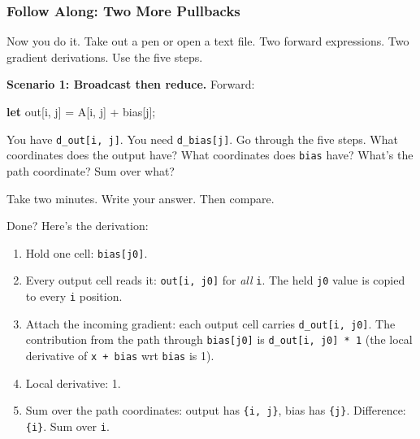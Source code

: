 \documentclass[11pt,titlepage]{article}
\newenvironment{Shaded}{}{}
\newcommand{\KeywordTok}[1]{\textcolor[rgb]{0.00,0.44,0.13}{\textbf{#1}}}
\newcommand{\NormalTok}[1]{#1}
\newcommand{\OperatorTok}[1]{\textcolor[rgb]{0.40,0.40,0.40}{#1}}
\providecommand{\tightlist}{%
  \setlength{\itemsep}{0pt}\setlength{\parskip}{0pt}}
\begin{document}
\vspace{2em}

\hypertarget{follow-along-two-more-pullbacks}{%
\subsubsection{Follow Along: Two More
Pullbacks}\label{follow-along-two-more-pullbacks}}

Now you do it. Take out a pen or open a text file. Two forward
expressions. Two gradient derivations. Use the five steps.

\textbf{Scenario 1: Broadcast then reduce.} Forward:

\begin{Shaded}
\begin{Highlighting}[]
\KeywordTok{let}\NormalTok{ out}\OperatorTok{[}\NormalTok{i, j}\OperatorTok{]}\NormalTok{ = A}\OperatorTok{[}\NormalTok{i, j}\OperatorTok{]}\NormalTok{ + bias}\OperatorTok{[}\NormalTok{j}\OperatorTok{]}\NormalTok{;}
\end{Highlighting}
\end{Shaded}

You have \texttt{d\_out{[}i,\ j{]}}. You need \texttt{d\_bias{[}j{]}}.
Go through the five steps. What coordinates does the output have? What
coordinates does \texttt{bias} have? What's the path coordinate? Sum
over what?

Take two minutes. Write your answer. Then compare.

\vspace{2em}

Done? Here's the derivation:

\begin{enumerate}
\def\labelenumi{\arabic{enumi}.}
\tightlist
\item
  Hold one cell: \texttt{bias{[}j0{]}}.
\item
  Every output cell reads it: \texttt{out{[}i,\ j0{]}} for \emph{all}
  \texttt{i}. The held \texttt{j0} value is copied to every \texttt{i}
  position.
\item
  Attach the incoming gradient: each output cell carries
  \texttt{d\_out{[}i,\ j0{]}}. The contribution from the path through
  \texttt{bias{[}j0{]}} is \texttt{d\_out{[}i,\ j0{]}\ *\ 1} (the local
  derivative of \texttt{x\ +\ bias} wrt \texttt{bias} is 1).
\item
  Local derivative: 1.
\item
  Sum over the path coordinates: output has \texttt{\{i,\ j\}}, bias has
  \texttt{\{j\}}. Difference: \texttt{\{i\}}. Sum over \texttt{i}.
\end{enumerate}
\end{document}
